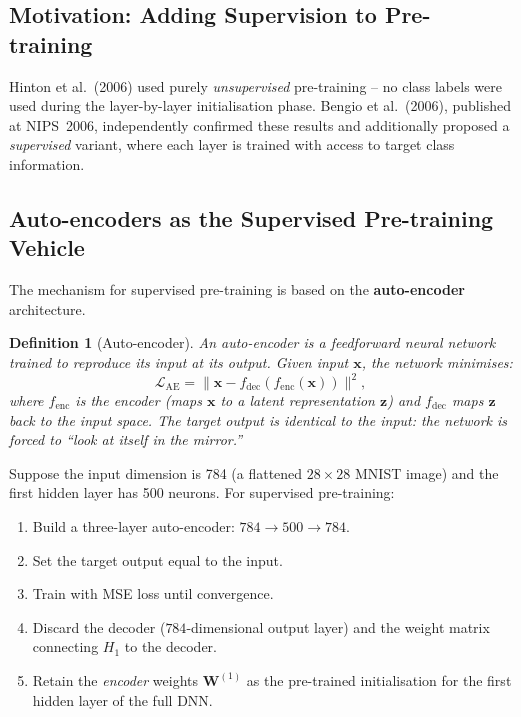 \documentclass[12pt,a4paper]{article}
\newtheorem{definition}{Definition}[section]
\newcommand{\loss}{\mathcal{L}}
\newcommand{\W}{\mathbf{W}}
\newcommand{\x}{\mathbf{x}}
\begin{document}
\subsection{Motivation: Adding Supervision to Pre-training}

Hinton et al.\ (2006) used purely \emph{unsupervised} pre-training -- no
class labels were used during the layer-by-layer initialisation phase.
Bengio et al.\ (2006), published at NIPS~2006, independently confirmed these
results and additionally proposed a \emph{supervised} variant, where each
layer is trained with access to target class information.

\subsection{Auto-encoders as the Supervised Pre-training Vehicle}

The mechanism for supervised pre-training is based on the
\textbf{auto-encoder} architecture.

\begin{definition}[Auto-encoder]
\label{def:autoencoder}
  An \emph{auto-encoder} is a feedforward neural network trained to reproduce
  its input at its output.  Given input $\x$, the network minimises:
  \begin{equation}
    \loss_{\text{AE}} = \|\x - f_{\text{dec}}(f_{\text{enc}}(\x))\|^2,
    \label{eq:ae-loss}
  \end{equation}
  where $f_{\text{enc}}$ is the \emph{encoder} (maps $\x$ to a latent
  representation $\mathbf{z}$) and $f_{\text{dec}}$ maps $\mathbf{z}$ back
  to the input space.  The target output is identical to the input: the
  network is forced to ``look at itself in the mirror.''
\end{definition}

\begin{example}
  Suppose the input dimension is 784 (a flattened $28 \times 28$ MNIST image)
  and the first hidden layer has 500 neurons.  For supervised pre-training:
  \begin{enumerate}
    \item Build a three-layer auto-encoder: $784 \to 500 \to 784$.
    \item Set the target output equal to the input.
    \item Train with MSE loss until convergence.
    \item Discard the decoder ($784$-dimensional output layer) and the weight
          matrix connecting $H_1$ to the decoder.
    \item Retain the \emph{encoder} weights $\W^{(1)}$ as the pre-trained
          initialisation for the first hidden layer of the full DNN.
  \end{enumerate}
\end{example}
\end{document}
